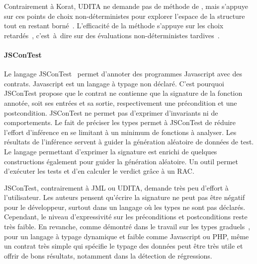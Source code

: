 Contrairement à Korat, UDITA ne demande pas de méthode de
, mais s'appuye sur ces points de choix
non-déterministes pour explorer l'espace de la structure tout en restant
borné~. L'efficacité de la méthode s'appuye
sur les choix retardés~, c'est~à~dire sur des évaluations
non-déterministes tardives~.

\paragraph{JSConTest} Le langage JSConTest~ permet d'annoter
des programmes Javascript avec des contrats. Javascript est un langage à typage
non déclaré. C'est pourquoi JSConTest propose que le contrat ne contienne que
la signature de la fonction annotée, soit ses entrées et sa sortie,
respectivement une précondition et une postcondition. JSConTest ne permet pas
d'exprimer d'invariants ni de comportements. Le fait de préciser les types
permet à JSConTest de réduire l'effort d'inférence en se limitant à un minimum
de fonctions à analyser. Les résultats de l'inférence servent à guider la
génération aléatoire de données de test. Le langage permettant d'exprimer la
signature est enrichi de quelques constructions également pour guider la
génération aléatoire. Un outil permet d'exécuter les tests et d'en calculer le
verdict grâce à un RAC.

JSConTest, contrairement à JML ou UDITA, demande très peu d'effort à
l'utilisateur. Les auteurs pensent qu'écrire la signature ne peut pas être
négatif pour le développeur, surtout dans un langage où les types ne sont pas
déclarés. Cependant, le niveau d'expressivité sur les préconditions et
postconditions reste très faible. En revanche, comme démontré dans le travail
sur les types graduels~, pour un langage à typage dynamique et
faible comme Javascript ou PHP, même un contrat très simple qui spécifie le
typage des données peut être très utile et offrir de bons résultats, notamment
dans la détection de régressions. \\

